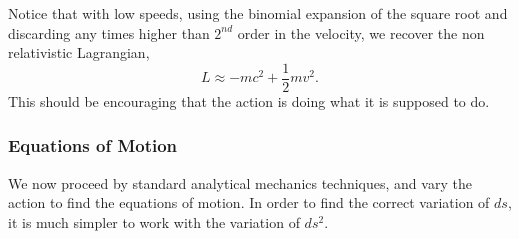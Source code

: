 \documentclass[a4paper,12pt]{article}
\numberwithin{equation}{section}
\begin{document}
Notice that with low speeds, using the binomial expansion of the square root and discarding any times higher than $2^{nd}$ order in the velocity, we recover the non relativistic Lagrangian, 
\begin{equation}
L \approx - mc^2 + \frac{1}{2} m v^2.
\end{equation} 
This should be encouraging that the action is doing what it is supposed to do. 
\subsubsection{Equations of Motion}
We now proceed by standard analytical mechanics techniques\cite{analytical}, and vary the action to find the equations of motion. In order to find the correct variation of $ds$, it is much simpler to work with the variation of $ds^2$.
\end{document}
